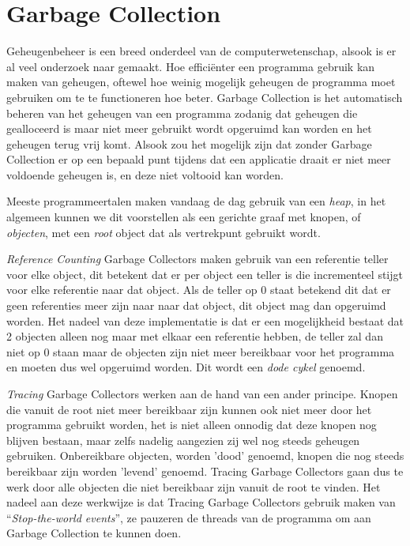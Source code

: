 \section{Garbage Collection}
\label{sec:Garbage collection}
Geheugenbeheer is een breed onderdeel van de computerwetenschap, alsook is er al veel onderzoek naar gemaakt.
Hoe efficiënter een programma gebruik kan maken van geheugen, oftewel hoe weinig mogelijk geheugen de programma moet gebruiken om te te functioneren hoe beter.
Garbage Collection is het automatisch beheren van het geheugen van een programma zodanig dat geheugen die gealloceerd is maar niet meer gebruikt wordt opgeruimd kan worden en het geheugen terug vrij komt.
Alsook zou het mogelijk zijn dat zonder Garbage Collection er op een bepaald punt tijdens dat een applicatie draait er niet meer voldoende geheugen is, en deze niet voltooid kan worden.

Meeste programmeertalen maken vandaag de dag gebruik van een \textit{heap}, in het algemeen kunnen we dit voorstellen als een gerichte graaf met knopen, of \textit{objecten}, met een \textit{root} object dat als vertrekpunt gebruikt wordt.


\textit{Reference Counting} Garbage Collectors maken gebruik van een referentie teller voor elke object, dit betekent dat er per object een teller is die incrementeel stijgt voor elke referentie naar dat object.
Als de teller op 0 staat betekend dit dat er geen referenties meer zijn naar naar dat object, dit object mag dan  opgeruimd worden.
Het nadeel van deze implementatie is dat er een mogelijkheid bestaat dat 2 objecten alleen nog maar met elkaar een referentie hebben, de teller zal dan niet op 0 staan maar de objecten zijn niet meer bereikbaar voor het programma en moeten dus wel opgeruimd worden.
Dit wordt een \textit{dode cykel} genoemd.\autocite{VanderCruysse2019}

\textit{Tracing} Garbage Collectors werken aan de hand van een ander principe.
Knopen die vanuit de root niet meer bereikbaar zijn kunnen ook niet meer door het programma gebruikt worden, het is niet alleen onnodig dat deze knopen nog blijven bestaan, maar zelfs nadelig aangezien zij wel nog steeds geheugen gebruiken.
Onbereikbare objecten, worden 'dood' genoemd, knopen die nog steeds bereikbaar zijn worden 'levend' genoemd.
Tracing Garbage Collectors gaan dus te werk door alle objecten die niet bereikbaar zijn vanuit de root te vinden. 
Het nadeel aan deze werkwijze is dat Tracing Garbage Collectors gebruik maken van ``\textit{Stop-the-world events}'', ze pauzeren de threads van de programma om aan Garbage Collection te kunnen doen.

